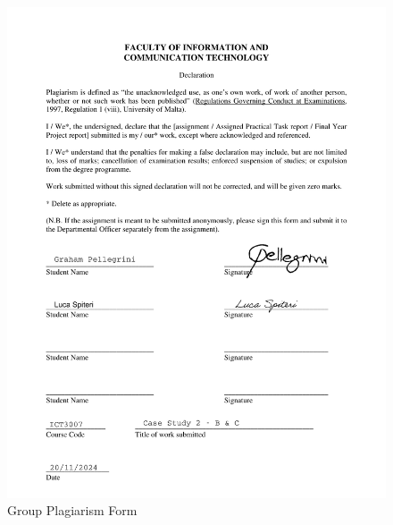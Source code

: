 \documentclass[a4paper,10pt]{article}
\begin{document}
\pagebreak
\begin{figure}[h]
    \centering
    \includegraphics[width=1\textwidth]{Group_Plagiarism_Form.pdf}
    \caption{Group Plagiarism Form}
\end{figure}
\end{document}
